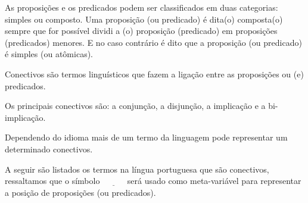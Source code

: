 As proposições e os predicados podem ser classificados em duas categorias: simples ou composto. Uma proposição (ou predicado) é dita(o) composta(o) sempre que for possível dividi a (o) proposição (predicado) em proposições (predicados) menores. E no caso contrário é dito que a proposição (ou predicado) é simples (ou atômicas).

\begin{definition}[Conectivos]\label{def:Conectivos}
	Conectivos são termos linguísticos que fazem a ligação entre as proposições ou (e) predicados.
\end{definition}

Os principais conectivos são: a conjunção, a disjunção, a implicação e a bi-implicação. 

\begin{rema}
	Dependendo do idioma mais de um termo da linguagem pode representar um determinado conectivos.
\end{rema}

A seguir são listados os termos na língua portuguesa que são conectivos, ressaltamos que o símbolo $\underline{ \ \ \ \ \ \ \ \ \ \ \ \ }$ será usado como meta-variável para representar a posição de proposições (ou predicados).

